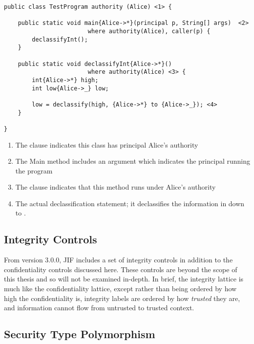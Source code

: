 \begin{verbatim}
public class TestProgram authority (Alice) <1> {
	
	public static void main{Alice->*}(principal p, String[] args)  <2>
						where authority(Alice), caller(p) {
		declassifyInt();
	}
	
	public static void declassifyInt{Alice->*}() 
						where authority(Alice) <3> {
		int{Alice->*} high;
		int low{Alice->_} low;
		
		low = declassify(high, {Alice->*} to {Alice->_}); <4>
	}

}
\end{verbatim}

\begin{enumerate}
	
	\item The  clause indicates this class has principal Alice's authority
	
	\item The Main method includes an argument which indicates the principal running the program
	
	\item The  clause indicates that this method runs under Alice's authority
	
	\item The actual declassification statement; it declassifies the information in  down to .
	
\end{enumerate}

\subsection{Integrity Controls}

From version 3.0.0, JIF includes a set of integrity controls in addition to the confidentiality controls discussed here. These controls are beyond the scope of this thesis and so will not be examined in-depth. In brief, the integrity lattice is much like the confidentiality lattice, except rather than being ordered by how high the confidentiality is, integrity labels are ordered by how \textit{trusted} they are, and information cannot flow from untrusted to trusted context.

\subsection{Security Type Polymorphism}

